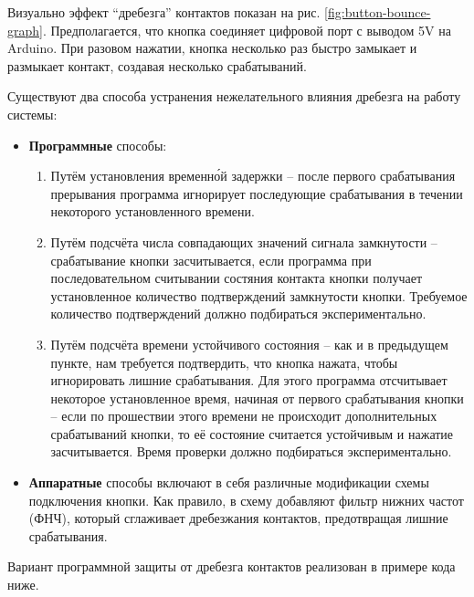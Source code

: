 \documentclass[../sparc.tex]{subfiles}
\begin{document}

Визуально эффект ``дребезга'' контактов показан на
рис. \ref{fig:button-bounce-graph}.  Предполагается, что кнопка соединяет
цифровой порт с выводом 5V на Arduino.  При разовом нажатии, кнопка несколько
раз быстро замыкает и размыкает контакт, создавая несколько срабатываний.

Существуют два способа устранения нежелательного влияния дребезга на работу
системы:
\begin{itemize}
\item \textbf{Программные} способы:
  \begin{enumerate}
  \item Путём установления временн\'ой задержки -- после первого срабатывания
    прерывания программа игнорирует последующие срабатывания в течении
    некоторого установленного времени.
  \item Путём подсчёта числа совпадающих значений сигнала замкнутости --
    срабатывание кнопки засчитывается, если программа при последовательном
    считывании состяния контакта кнопки получает установленное количество
    подтверждений замкнутости кнопки.  Требуемое количество подтверждений должно
    подбираться экспериментально.
  \item Путём подсчёта времени устойчивого состояния -- как и в предыдущем
    пункте, нам требуется подтвердить, что кнопка нажата, чтобы игнорировать
    лишние срабатывания.  Для этого программа отсчитывает некоторое
    установленное время, начиная от первого срабатывания кнопки -- если по
    прошествии этого времени не происходит дополнительных срабатываний кнопки,
    то её состояние считается устойчивым и нажатие засчитывается.  Время
    проверки должно подбираться экспериментально.
  \end{enumerate}
\item \textbf{Аппаратные} способы включают в себя различные модификации схемы
  подключения кнопки.  Как правило, в схему добавляют фильтр нижних частот
  (ФНЧ), который сглаживает дребезжания контактов, предотвращая лишние
  срабатывания.
\end{itemize}

Вариант программной защиты от дребезга контактов реализован в примере кода ниже.
\end{document}
